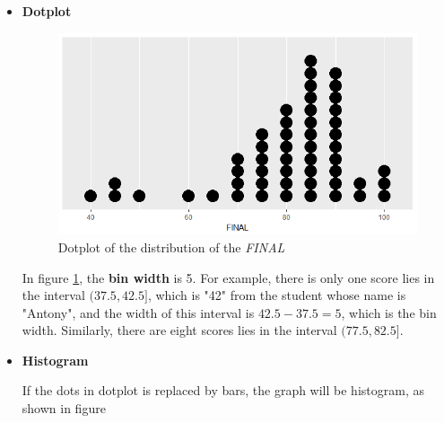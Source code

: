 \documentclass[a4paper, 12pt,twoside]{book}
\begin{document}
\begin{itemize}
\item \textbf{Dotplot}
\begin{figure}[H]
\centering
\includegraphics[scale=0.5]{Dotplot.png}
\caption{Dotplot of the distribution of the \textit{FINAL}}
\label{dotplot}
\end{figure}
In figure \ref{dotplot}, the \textbf{bin width} is 5. For example, there is only one score lies in the interval $(37.5, 42.5]$, which is "42" from the student whose name is "Antony", and the width of this interval is $42.5-37.5 = 5$, which is the bin width. Similarly, there are eight scores lies in the interval $(77.5, 82.5]$. 

\item \textbf{Histogram}

If the dots in dotplot is replaced by bars, the graph will be histogram, as shown in figure 


\end{itemize}
\end{document}
